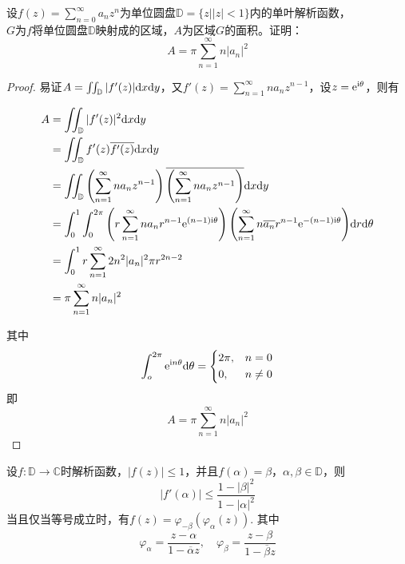 \begin{proposition}
    
    设$f(z) = \sum\limits_{n = 0}^{\infty}{a_nz^n}$为单位圆盘$\mathbb{D} = \{z\big| |z| < 1\}$内的单叶解析函数，\\
    $G$为$f$将单位圆盘$\mathbb{D}$映射成的区域，$A$为区域$G$的面积。证明：
    $$A =  \pi\sum\limits_{n = 1}^{\infty}{n|a_n|^2}$$

\end{proposition}

\begin{proof}
    
    易证$A = \iint_{\mathbb{D}}{|f'(z)|}\mathrm{d} x\mathrm{d} y$，又$f'(z) = \sum\limits_{n = 1}^{\infty}{na_nz^{n - 1}}$，设$z = \mathrm{e}^{\mathrm{i}\theta}$，则有

    \begin{align*}
        A & = \iint_{\mathbb{D}}{|f'(z)|^2}\mathrm{d} x\mathrm{d} y \\ 
          & = \iint_{\mathbb{D}}{f'(z)\overline{{f'(z)}}}\mathrm{d} x\mathrm{d} y \\
          & = \iint_{\mathbb{D}}{\left( \sum\limits_{n = 1}^{\infty}{na_nz^{n - 1}} \right)\overline{\left( \sum\limits_{n = 1}^{\infty}{na_nz^{n - 1}} \right)}}\mathrm{d} x\mathrm{d} y \\
          & = \int_{0}^{1}{\int_{0}^{2 \pi}{\left( r\sum\limits_{n = 1}^{\infty}{na_nr^{n - 1}\mathrm{e}^{(n - 1)\mathrm{i}\theta}} \right)\left( \sum\limits_{n = 1}^{\infty}{n\overline{a_n}r^{n - 1}\mathrm{e}^{-(n - 1)\mathrm{i}\theta}} \right)}\mathrm{d} r}\mathrm{d} \theta \\
          & = \int_{0}^{1}{r\sum\limits_{n = 1}^{\infty}{2n^2|a_n|^2 \pi r^{2n - 2}}} \\
          & = \pi \sum\limits_{n = 1}^{\infty}{n|a_n|^2}
    \end{align*}

    其中
    $$
    \int_{o}^{2\pi}{\mathrm{e}^{\mathrm{i} n\theta}}\mathrm{d} \theta = 
    \left\{
        \begin{aligned}
            &2\pi, & n = 0 \\
            &0, & n \neq 0 \\
        \end{aligned}
    \right.
    $$
    即
    $$A = \pi \sum\limits_{n = 1}^{\infty}{n|a_n|^2}$$

\end{proof}

\begin{proposition}

    设$f:\mathbb{D} \to \mathbb{C}$时解析函数，$|f(z)| \leq 1$，并且$f(\alpha) = \beta$，$\alpha, \beta \in \mathbb{D}$，则
    $$|f'(\alpha)| \leq \dfrac{1 - |\beta|^2}{1 - |\alpha|^2}$$
    当且仅当等号成立时，有$f(z) = \varphi_{-\beta}(\varphi_{\alpha}(z))$. 其中
    $$\varphi_{\alpha} = \dfrac{z - \alpha}{1 - \overline{\alpha}{z}}, \quad \varphi_{\beta} = \dfrac{z - \beta}{1 - \overline{\beta}{z}}$$

\end{proposition}

